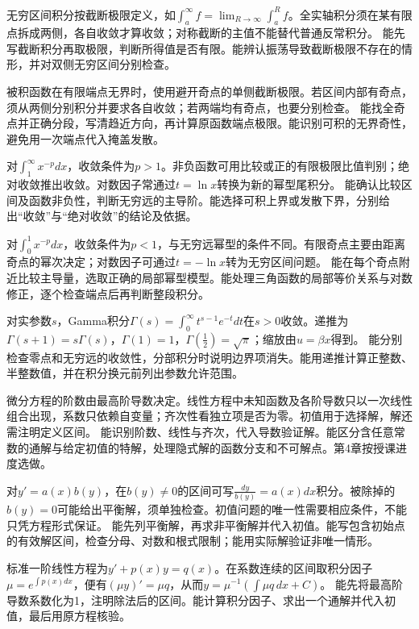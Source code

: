 {无穷区间积分按截断极限定义，如$\int_a^{\infty}f=\lim_{R\to\infty}\int_a^Rf$。全实轴积分须在某有限点拆成两侧，各自收敛才算收敛；对称截断的主值不能替代普通反常积分。}
{能先写截断积分再取极限，判断所得值是否有限。能辨认振荡导致截断极限不存在的情形，并对双侧无穷区间分别检查。}

{被积函数在有限端点无界时，使用避开奇点的单侧截断极限。若区间内部有奇点，须从两侧分别积分并要求各自收敛；若两端均有奇点，也要分别检查。}
{能找全奇点并正确分段，写清趋近方向，再计算原函数端点极限。能识别可积的无界奇性，避免用一次端点代入掩盖发散。}

{对$\int_1^{\infty}x^{-p}dx$，收敛条件为$p>1$。非负函数可用比较或正的有限极限比值判别；绝对收敛推出收敛。对数因子常通过$t=\ln x$转换为新的幂型尾积分。}
{能确认比较区间及函数非负性，判断无穷远的主导阶。能选择可积上界或发散下界，分别给出“收敛”与“绝对收敛”的结论及依据。}

{对$\int_0^1x^{-p}dx$，收敛条件为$p<1$，与无穷远幂型的条件不同。有限奇点主要由距离奇点的幂次决定；对数因子可通过$t=-\ln x$转为无穷区间问题。}
{能在每个奇点附近比较主导量，选取正确的局部幂型模型。能处理三角函数的局部等价关系与对数修正，逐个检查端点后再判断整段积分。}

{对实参数$s$，Gamma积分$\Gamma(s)=\int_0^{\infty}t^{s-1}e^{-t}dt$在$s>0$收敛。递推为$\Gamma(s+1)=s\Gamma(s)$，$\Gamma(1)=1$，$\Gamma(\frac12)=\sqrt\pi$；缩放由$u=\beta x$得到。}
{能分别检查零点和无穷远的收敛性，分部积分时说明边界项消失。能用递推计算正整数、半整数值，并在积分换元前列出参数允许范围。}

{微分方程的阶数由最高阶导数决定。线性方程中未知函数及各阶导数只以一次线性组合出现，系数只依赖自变量；齐次性看独立项是否为零。初值用于选择解，解还需注明定义区间。}
{能识别阶数、线性与齐次，代入导数验证解。能区分含任意常数的通解与给定初值的特解，处理隐式解的函数分支和不可解点。第4章按授课进度选做。}

{对$y'=a(x)b(y)$，在$b(y)\ne0$的区间可写$\frac{dy}{b(y)}=a(x)dx$积分。被除掉的$b(y)=0$可能给出平衡解，须单独检查。初值问题的唯一性需要相应条件，不能只凭方程形式保证。}
{能先列平衡解，再求非平衡解并代入初值。能写包含初始点的有效解区间，检查分母、对数和根式限制；能用实际解验证非唯一情形。}

{标准一阶线性方程为$y'+p(x)y=q(x)$。在系数连续的区间取积分因子$\mu=e^{\int p(x)dx}$，便有$(\mu y)'=\mu q$，从而$y=\mu^{-1}(\int\mu q\,dx+C)$。}
{能先将最高阶导数系数化为1，注明除法后的区间。能计算积分因子、求出一个通解并代入初值，最后用原方程核验。}

